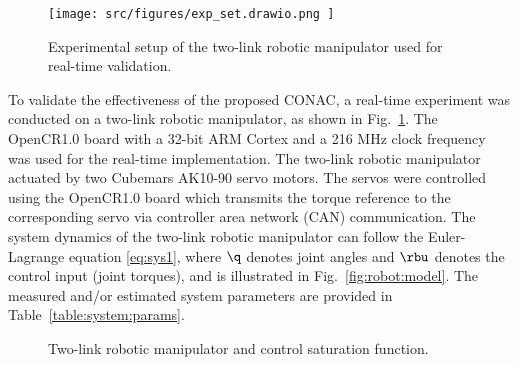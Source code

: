 \documentclass[journal]{IEEEtran}
\begin{document}
\begin{figure}[t]
    \centering
        \texttt{[image: 
            src/figures/exp\_set.drawio.png
        ]}%
    \caption{
        Experimental setup of the two-link robotic manipulator used for real-time validation.
    }
    \label{fig:ctrl:exp:set}
\end{figure}

To validate the effectiveness of the proposed CONAC, a real-time experiment was conducted on a two-link robotic manipulator, as shown in Fig.~\ref{fig:ctrl:exp:set}. 
The OpenCR1.0 board \cite{opencr} with a 32-bit ARM Cortex and a 216 MHz clock frequency was used for the real-time implementation.
The two-link robotic manipulator actuated by two Cubemars AK10-90 servo motors. 
The servos were controlled using the OpenCR1.0 board which transmits the torque reference to the corresponding servo via controller area network (CAN) communication.
The system dynamics of the two-link robotic manipulator can follow the Euler-Lagrange equation \eqref{eq:sys1}, where $\q$ denotes joint angles and $\rbu$ denotes the control input (joint torques), and is illustrated in Fig.~\ref{fig:robot:model}. 
The measured and/or estimated system parameters are provided in Table~\ref{table:system:params}. 

\begin{figure}[t]
    \centering
    \hfill
    \caption{Two-link robotic manipulator and control saturation function.}
    \label{fig:robot}
\end{figure}
\end{document}
